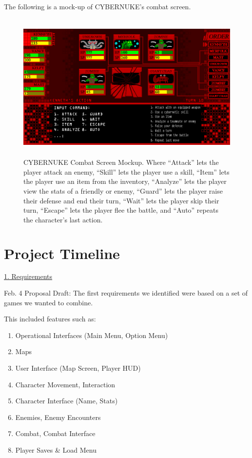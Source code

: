 \documentclass[10pt,conference,onecolumn,compsoc]{IEEEtran}
\begin{document}
\pagebreak
The following is a mock-up of CYBERNUKE's combat screen.
\begin{figure}[ht!]
\centering
\includegraphics[height=281.25px, width=500px]{Mockups/CYBERNUKE_COMBAT_MOCKUP.png}
\caption{CYBERNUKE Combat Screen Mockup. Where “Attack” lets the player attack an enemy, “Skill” lets the player use a skill, “Item” lets the player use an item from the inventory, “Analyze” lets the player view the stats of a friendly or enemy, “Guard” lets the player raise their defense and end their turn, “Wait” lets the player skip their turn, “Escape” lets the player flee the battle, and “Auto” repeats the character's last action.}
\label{combat_mockup}
\end{figure}


\pagebreak
\section{Project Timeline}

\underline{1. Requirements}
\vspace{5px}

Feb. 4 Proposal Draft: The first requirements we identified were based on a set of games we wanted to combine. 

This included features such as:
\begin{enumerate}
\item Operational Interfaces (Main Menu, Option Menu)
\item Maps
\item User Interface (Map Screen, Player HUD)
\item Character Movement, Interaction
\item Character Interface (Name, Stats)
\item Enemies, Enemy Encounters
\item Combat, Combat Interface
\item Player Saves \& Load Menu
\end{enumerate}
\end{document}
